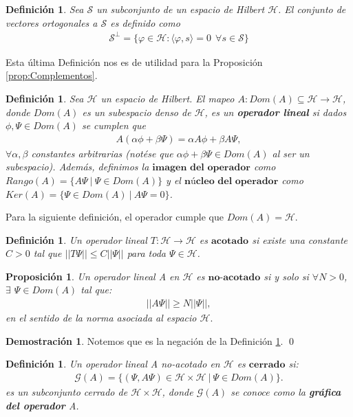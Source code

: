 \documentclass[12pt]{article}
\newtheorem{defn}[teo]{Definición}
\newtheorem{prop}[teo]{Proposición}
\theoremstyle{definition}
\newtheorem*{demo}{Demostración}
\begin{document}
\begin{defn}
    Sea $\mathcal{S}$ un subconjunto de un espacio de Hilbert $\mathcal{H}$. El conjunto de vectores ortogonales a $\mathcal{S}$ es definido como
    \begin{align*}
        \mathcal{S}^\perp = \{\varphi\in\mathcal{H}: \langle\varphi,s\rangle = 0 \:\:\forall s\in\mathcal{S}\}
    \end{align*}
\end{defn}
\noindent
Esta última Definición nos es de utilidad para la Proposición 
\ref{prop:Complementos}.
\begin{defn}
    Sea $\mathcal{H}$ un espacio de Hilbert. El mapeo $A:Dom(A)\subseteq\mathcal{H}\longrightarrow\mathcal{H}$, donde $Dom(A)$ es un subespacio denso de $\mathcal{H}$, es un \textbf{operador lineal} si dados $\phi,\Psi \in Dom(A)$ se cumplen que
    \begin{align*}
        A(\alpha\phi + \beta\Psi) = \alpha A\phi + \beta A \Psi,
    \end{align*}
    $\forall \alpha, \beta$ constantes arbitrarias (notése que $\alpha\phi + \beta\Psi \in Dom(A)$ al ser un subespacio).
    Además, definimos la $\textbf{imagen del operador}$ como $Rango(A) = \{A\Psi\: | \: \Psi\in Dom(A)\}$ y el $\textbf{núcleo del operador}$ como $Ker(A) = \{\Psi\in Dom(A)
    \:|\: A\Psi = 0 \}$.
    \label{def:OpLin}
\end{defn}
\noindent
Para la siguiente definición, el operador cumple que $Dom(A) = \mathcal{H}$.
\begin{defn}
    Un operador lineal\: $T:\mathcal{H} \longrightarrow \mathcal{H}$ es $\textbf{acotado}$ si existe una constante $C > 0$ tal que $||T\Psi|| \leq C||\Psi||$ para toda $\Psi \in \mathcal{H}$.
    \label{def:opeAcot}
\end{defn}
\begin{prop}
    Un operador lineal A en $\mathcal{H}$ es $\textbf{no-acotado}$ si y solo si $\forall N > 0$, $\exists$ $\Psi\in Dom(A)$ tal que:
    \begin{align*}
        ||A\Psi|| \geq N ||\Psi||,
    \end{align*}
    en el sentido de la norma asociada al espacio $\mathcal{H}.$
\end{prop}
\begin{demo}
    Notemos que es la negación de la Definición \ref{def:opeAcot}.
    \qed 
\end{demo}
\begin{defn}
    Un operador lineal A no-acotado en $\mathcal{H}$ es $\textbf{cerrado}$ si:
    \begin{align*}
        \mathcal{G}(A) = \{(\Psi,A\Psi) \in \mathcal{H}\times\mathcal{H} \:|\: \Psi \in Dom(A) \}.
    \end{align*}
    es un subconjunto cerrado de $\mathcal{H}\times\mathcal{H}$, donde $\mathcal{G}(A) $ se conoce como la \textbf{gráfica del operador} A.
\end{defn}
\end{document}

